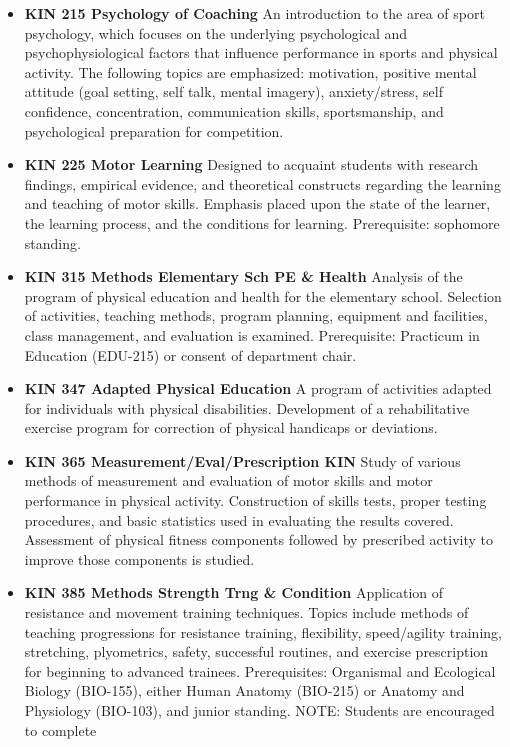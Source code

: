 \documentclass[
  letterpaper,
]{scrbook}
\begin{document}
\begin{itemize}
\item
  \textbf{KIN 215 Psychology of Coaching} An introduction to the area of
  sport psychology, which focuses on the underlying psychological and
  psychophysiological factors that influence performance in sports and
  physical activity. The following topics are emphasized: motivation,
  positive mental attitude (goal setting, self talk, mental imagery),
  anxiety/stress, self confidence, concentration, communication skills,
  sportsmanship, and psychological preparation for competition.
\item
  \textbf{KIN 225 Motor Learning} Designed to acquaint students with
  research findings, empirical evidence, and theoretical constructs
  regarding the learning and teaching of motor skills. Emphasis placed
  upon the state of the learner, the learning process, and the
  conditions for learning. Prerequisite: sophomore standing.
\item
  \textbf{KIN 315 Methods Elementary Sch PE \& Health} Analysis of the
  program of physical education and health for the elementary school.
  Selection of activities, teaching methods, program planning, equipment
  and facilities, class management, and evaluation is examined.
  Prerequisite: Practicum in Education (EDU-215) or consent of
  department chair.
\item
  \textbf{KIN 347 Adapted Physical Education} A program of activities
  adapted for individuals with physical disabilities. Development of a
  rehabilitative exercise program for correction of physical handicaps
  or deviations.
\item
  \textbf{KIN 365 Measurement/Eval/Prescription KIN} Study of various
  methods of measurement and evaluation of motor skills and motor
  performance in physical activity. Construction of skills tests, proper
  testing procedures, and basic statistics used in evaluating the
  results covered. Assessment of physical fitness components followed by
  prescribed activity to improve those components is studied.
\item
  \textbf{KIN 385 Methods Strength Trng \& Condition} Application of
  resistance and movement training techniques. Topics include methods of
  teaching progressions for resistance training, flexibility,
  speed/agility training, stretching, plyometrics, safety, successful
  routines, and exercise prescription for beginning to advanced
  trainees. Prerequisites: Organismal and Ecological Biology (BIO-155),
  either Human Anatomy (BIO-215) or Anatomy and Physiology (BIO-103),
  and junior standing. NOTE: Students are encouraged to complete

\end{itemize}
\end{document}
